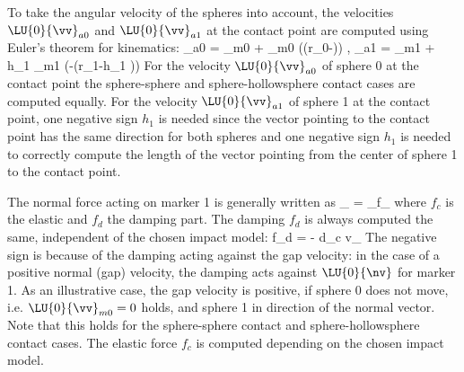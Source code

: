     To take the angular velocity of the spheres into account, the velocities $\LU{0}{\vv}_{a0}$ and $\LU{0}{\vv}_{a1}$ at the contact point are computed using Euler's theorem for kinematics:
    \be
    _{a0} = _{m0} + _{m0} \times \left(\cdot \left(r_0-\right)\right)
    , \qquad
    _{a1} = _{m1} + h_1 _{m1} \times \left(-\cdot \left(r_1-h_1 \right)\right) \eqDot
    \ee
    For the velocity $\LU{0}{\vv}_{a0}$ of sphere 0 at the contact point the sphere-sphere and sphere-hollowsphere contact cases are computed equally. For the velocity $\LU{0}{\vv}_{a1}$ of sphere 1 at the contact point, one negative sign $h_1$ is needed since the vector pointing to the contact point has the same direction for both spheres and one negative sign $h_1$ is needed to correctly compute the length of the vector pointing from the center of sphere 1 to the contact point.

    The normal force acting on marker 1 is generally written as
    \be
    _ = _{f_} \cdot {} \eqComma
    \ee
    where $f_c$ is the elastic and $f_d$ the damping part. The damping $f_d$ is always computed the same, independent of the chosen impact model:
    \be
    f_d = - d_c v_ \eqDot
    \ee
    The negative sign is because of the damping acting against the gap velocity: in the case of a positive normal (gap) velocity, the damping acts against $\LU{0}{\nv}$ for marker 1. As an illustrative case, the gap velocity is positive, if sphere 0 does not move, i.e. $\LU{0}{\vv}_{m0}=0$ holds, and sphere 1 in direction of the normal vector. Note that this holds for the sphere-sphere contact and sphere-hollowsphere contact cases. The elastic force $f_c$ is computed depending on the chosen impact model.

